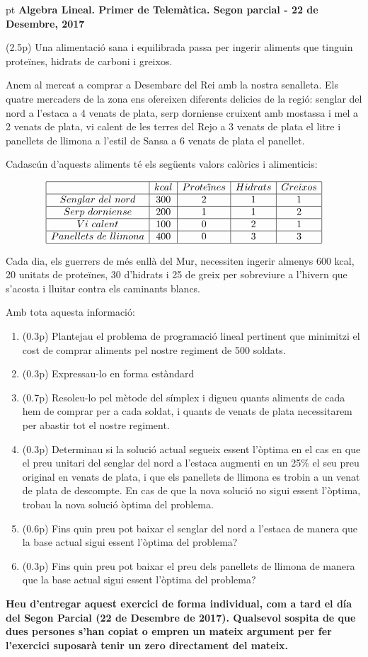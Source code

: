 \documentclass[12pt]{article}
\newcounter{problemes}
\newcounter{punts}
\newcommand{\probl}{\addtocounter{problemes}{1}
\setcounter{punts}{0}
\medskip\noindent{{\bf \theproblemes) }}}
\begin{document}
\pagestyle{empty}

 pt
{\bf Algebra Lineal. Primer de Telemàtica. 
\hfill Segon parcial - 22 de Desembre, 2017}
 

\vspace{0.6 cm}
\probl (2.5p) Una alimentació sana i equilibrada passa per ingerir aliments que tinguin proteïnes, hidrats de carboni i greixos. 

Anem al mercat a comprar a Desembarc del Rei amb la nostra senalleta. Els quatre mercaders de la zona ens ofereixen diferents delicies de la regió: senglar del nord a l'estaca a 4 venats de plata, serp dorniense cruixent amb mostassa i mel a 2 venats de plata, vi calent de les terres del Rejo a 3 venats de plata el litre i panellets de llimona a l'estil de Sansa a 6 venats de plata el panellet.

Cadascún d'aquests aliments té els següents valors calòrics i alimenticis:


$$
\begin{array}{|c|c|c|c|c|}\hline  & kcal & Prote\text{ï}nes & Hidrats & Greixos \\\hline Senglar\ del\ nord & 300 & 2 & 1 & 1 \\\hline Serp\ dorniense & 200 & 1 & 1 & 2 \\\hline Vi\ calent & 100 & 0 & 2 & 1 \\\hline Panellets\ de\ llimona & 400 & 0 & 3 & 3 \\\hline \end{array}
$$


Cada dia, els guerrers de més enllà del Mur, necessiten ingerir almenys 600 kcal, 20 unitats de proteïnes, 30 d'hidrats i 25 de greix per sobreviure a l'hivern que s'acosta i lluitar contra els caminants blancs. 

Amb tota aquesta informació:
\begin{enumerate}
\item (0.3p) Plantejau el problema de programació lineal pertinent que minimitzi el cost de comprar aliments pel nostre regiment de 500 soldats. 
\item (0.3p) Expressau-lo en forma estàndard 
\item (0.7p) Resoleu-lo pel mètode del símplex i digueu quants aliments de cada hem de comprar per a cada soldat, i quants de venats de plata necessitarem per abastir tot el nostre regiment. 
\item (0.3p) Determinau si la solució actual segueix essent l'òptima en el cas en que el preu unitari del senglar del nord a l'estaca augmenti en un 25$\%$ el seu preu original en venats de plata, i que els panellets de llimona es trobin a un venat de plata de descompte. En cas de que la nova solució no sigui essent l'òptima, trobau la nova solució òptima del problema. 
\item (0.6p) Fins quin preu pot baixar el senglar del nord a l'estaca de manera que la base actual sigui essent l'òptima del problema?
\item (0.3p) Fins quin preu pot baixar el preu dels panellets de llimona de manera que la base actual sigui essent l'òptima del problema?
\end{enumerate}


\textbf{Heu d'entregar aquest exercici de forma individual, com a tard el día del Segon Parcial (22 de Desembre de 2017). Qualsevol sospita de que dues persones s'han copiat o empren un mateix argument per fer l'exercici suposarà tenir un zero directament del mateix.}

\vspace{0.6 cm}
\end{document}
